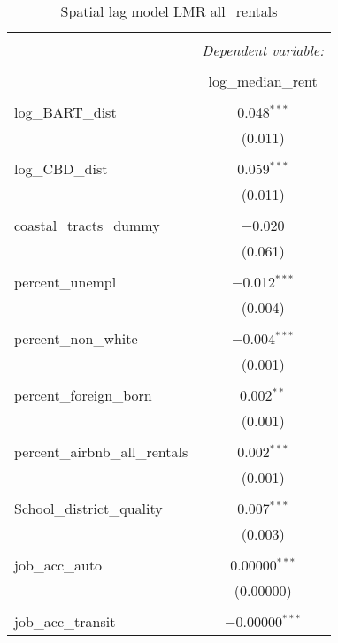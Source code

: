\documentclass[10pt, letterpaper]{amsart}
\begin{document}
 
\begin{table}[H] \centering 
  \caption{Spatial lag model LMR all\_rentals} 
  \label{} 
  \begin{tabular}{@{\extracolsep{5pt}}lc} 
    \\[-1.8ex]\hline 
    \hline \\[-1.8ex] 
    & \multicolumn{1}{c}{\textit{Dependent variable:}} \\ 
    \cline{2-2} 
    \\[-1.8ex] & log\_median\_rent \\ 
    \hline \\[-1.8ex] 
    log\_BART\_dist & 0.048$^{***}$ \\ 
    & (0.011) \\ 
    & \\ 
    log\_CBD\_dist & 0.059$^{***}$ \\ 
    & (0.011) \\ 
    & \\ 
    coastal\_tracts\_dummy & $-$0.020 \\ 
    & (0.061) \\ 
    & \\ 
    percent\_unempl & $-$0.012$^{***}$ \\ 
    & (0.004) \\ 
    & \\ 
    percent\_non\_white & $-$0.004$^{***}$ \\ 
    & (0.001) \\ 
    & \\ 
    percent\_foreign\_born & 0.002$^{**}$ \\ 
    & (0.001) \\ 
    & \\ 
    percent\_airbnb\_all\_rentals & 0.002$^{***}$ \\ 
    & (0.001) \\ 
    & \\ 
    School\_district\_quality & 0.007$^{***}$ \\ 
    & (0.003) \\ 
    & \\ 
    job\_acc\_auto & 0.00000$^{***}$ \\ 
    & (0.00000) \\ 
    & \\ 
    job\_acc\_transit & $-$0.00000$^{***}$ \\ 

\end{tabular}
\end{table}
\end{document}
